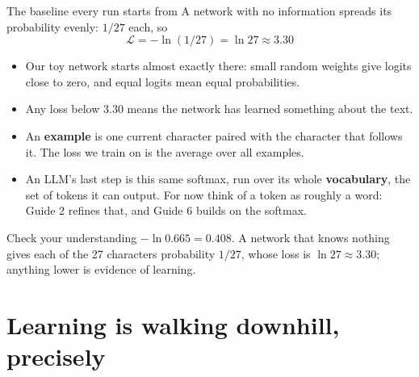 \documentclass[aspectratio=169,11pt,t,\primeropts]{beamer}
\begin{document}
\begin{frame}{The baseline every run starts from}
  A network with no information spreads its probability evenly: $1/27$ each, so
  \[ \mathcal{L} = -\ln(1/27) = \ln 27 \approx 3.30 \]
  \begin{itemize}
    \item Our toy network starts almost exactly there: small random weights give logits close
      to zero, and equal logits mean equal probabilities.
    \item Any loss below $3.30$ means the network has learned something about the text.
    \item An \textbf{example} is one current character paired with the character that follows
      it. The loss we train on is the average over all examples.
    \item An LLM's last step is this same softmax, run over its whole \textbf{vocabulary}, the set
      of tokens it can output. For now think of a token as roughly a word: Guide 2 refines
      that, and Guide 6 builds on the softmax.
  \end{itemize}
\end{frame}

\begin{frame}{Check your understanding}
  {$-\ln 0.665 = 0.408$. A network that knows nothing gives each of the 27 characters
    probability $1/27$, whose loss is $\ln 27 \approx 3.30$; anything lower is evidence of
    learning.}
\end{frame}

\section{Learning is walking downhill, precisely}
\end{document}
